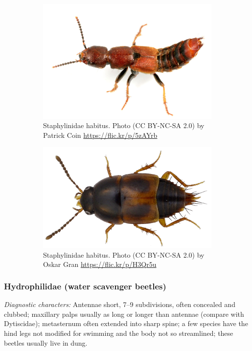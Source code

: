 \documentclass[letterpaper, 11pt]{article}
\begin{document}
\begin{figure}[ht!]
  \centering
\begin{subfigure}[ht!]{0.45\textwidth}
    \includegraphics[width=\textwidth]{staphylinidHabitus}
  \caption{Staphylinidae habitus. Photo (CC BY-NC-SA 2.0) by Patrick Coin \url{https://flic.kr/p/5zAYrb}}
  \label{fig:staphylinid1}
\end{subfigure}
    \qquad
\begin{subfigure}[ht!]{0.45\textwidth}
    \includegraphics[width=\textwidth]{staphylinid2}
  \caption{Staphylinidae habitus. Photo (CC BY-NC-SA 2.0) by Oskar Gran \url{https://flic.kr/p/H3Qr5u}}
  \label{fig:staphylinid2}
\end{subfigure}
    \caption{}\label{fig:staphylinids}
\end{figure}

\subsubsection{Hydrophilidae (water scavenger beetles)}
\noindent{}\textit{Diagnostic characters:} Antennae short, 7--9 subdivisions, often concealed and clubbed; maxillary palps usually as long or longer than antennae (compare with Dytiscidae); metasternum often extended into sharp spine; a few species have the hind legs not modified for swimming and the body not so streamlined; these beetles usually live in dung.\\
\end{document}
